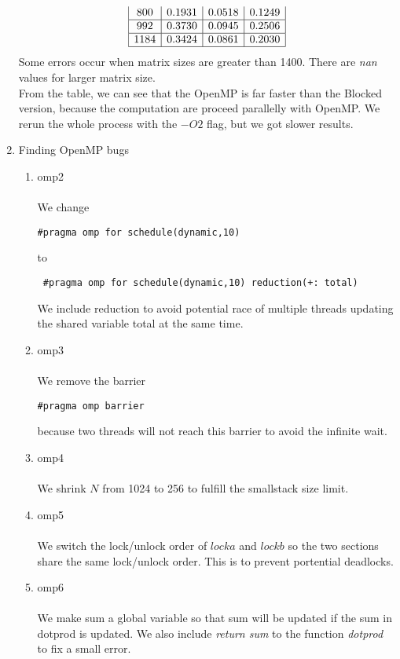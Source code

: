 \documentclass{article}
\begin{document}
\begin{enumerate}
\[\begin{array}{|c|c|c|c|c|}
800 & 0.1931 & 0.0518&0.1249\\ \hline
992 & 0.3730 & 0.0945 &0.2506\\ \hline
1184 & 0.3424 & 0.0861&0.2030\\ \hline
\end{array}
\]
Some errors occur when matrix sizes are greater than 1400. There are \emph{nan} values
for larger matrix size.
\\
From the table, we can see that the OpenMP is far faster than the Blocked version, because the computation are proceed parallelly with OpenMP. We rerun the whole process with the $-O2$ flag, but we got slower results.
\newpage
\item Finding OpenMP bugs
\begin{enumerate}
\item omp2
\\ \\
We change \begin{verbatim}#pragma omp for schedule(dynamic,10) \end{verbatim} to \begin{verbatim} #pragma omp for schedule(dynamic,10) reduction(+: total) \end{verbatim}
We include reduction to avoid potential race of multiple threads updating the shared variable total at the same time. 
\item omp3
\\ \\
We remove the barrier \begin{verbatim}#pragma omp barrier \end{verbatim}
because two threads will not reach this barrier to avoid the infinite wait.
\item omp4
\\ \\
We shrink $N$ from 1024 to 256 to fulfill the smallstack size limit.
\item omp5
\\ \\
We switch the lock/unlock order of $locka$ and $lockb$ so the two sections share the same lock/unlock order.
This is to prevent portential deadlocks.
\item omp6
\\ \\
We make sum a global variable so that sum will be updated if the sum in dotprod is updated. We also include 
\emph{return sum} to the function \emph{dotprod} to fix a small error.
\end{enumerate}

\end{enumerate}
\end{document}
